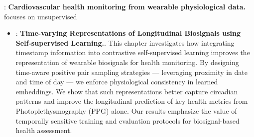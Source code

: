 \textbf{}: \textbf{Cardiovascular health monitoring from wearable physiological data.} focuses on unsupervised 

\begin{itemize}
    \item \textbf{}: \textbf{Time-varying Representations of Longitudinal Biosignals using Self-supervised Learning.}.  
    This chapter investigates how integrating timestamp information into contrastive self-supervised learning improves the representation of wearable biosignals for health monitoring. By designing time-aware positive pair sampling strategies — leveraging proximity in date and time of day — we enforce physiological consistency in learned embeddings. We show that such representations better capture circadian patterns and improve the longitudinal prediction of key health metrics from Photoplethysmography (PPG) alone. Our results emphasize the value of temporally sensitive training and evaluation protocols for biosignal-based health assessment.   
    

\end{itemize}